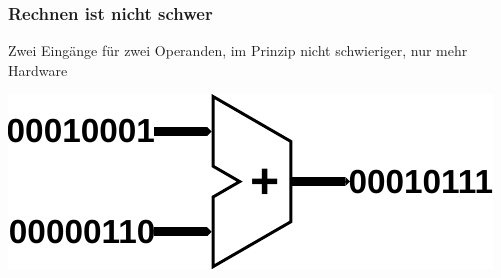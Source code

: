 \documentclass[t,aspectratio=169,usenames,dvipsnames]{beamer}
\begin{document}

\begin{frame}[c]
  \frametitle{Rechnen ist nicht schwer}

  \strut{}Zwei Eingänge für zwei Operanden, im Prinzip nicht schwieriger, nur mehr Hardware

  \bigskip

  \centering\includegraphics[width=.9\textwidth]{adder.pdf}
\end{frame}
\end{document}
